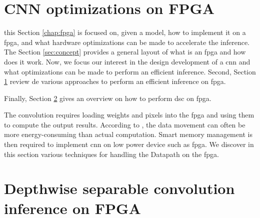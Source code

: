 \section{CNN optimizations on FPGA} \label{sec:opti_dataflow}
%
%
this Section \ref{chap:fpga} is focused on, given a model, how to implement it on a \acrshort{fpga}, and what hardware optimizations can be made to accelerate the inference.
The Section \ref{sec:concept} provides a general layout of what is an \acrshort{fpga} and how does it work. Now, we focus our interest in the design development of a \acrshort{cnn} and what optimizations can be made to perform an efficient inference.
Second, Section \ref{sec:opti_dataflow} review de various approaches to perform an efficient inference on \acrshort{fpga}.

Finally, Section \ref{sec:inf_fpga} gives an overview on how to perform \acrshort{dsc} on \acrshort{fpga}.

The convolution requires loading weights and pixels into the \acrshort{fpga} and using them to compute the output results. According to \textcite{chen_eyeriss_2017}, the data movement can often be more energy-consuming than actual computation. Smart memory management is then required to implement \acrshort{cnn} on low power device such as \acrshort{fpga}. We discover in this section various techniques for handling the Datapath on the \acrshort{fpga}.
%

%
%
\section{Depthwise separable convolution inference on FPGA} \label{sec:inf_fpga}
%
%

